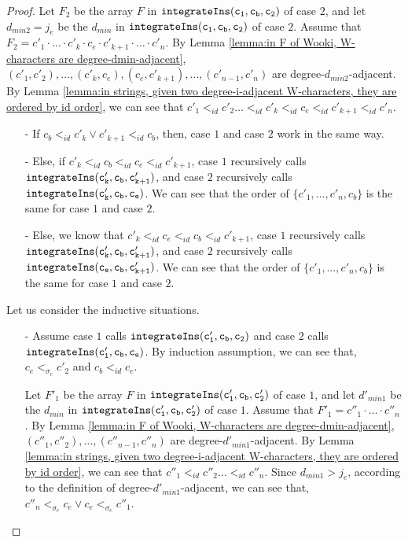 \begin {proof}
Let $F_2$ be the array $F$ in $\alabelshort[{\tt integrateIns}]{c_1,c_b,c_2}$ of case $2$, and let $d_{min2}=j_e$ be the $d_{min}$ in $\alabelshort[{\tt integrateIns}]{c_1,c_b,c_2}$ of case $2$. Assume that $F_2 = c'_1 \cdot \ldots \cdot c'_k \cdot c_e \cdot c'_{k+1} \cdot \ldots \cdot c'_n$. By Lemma \ref{lemma:in F of Wooki, W-characters are degree-dmin-adjacent}, $(c'_1,c'_2),\ldots,(c'_k,c_e),(c_e,c'_{k+1}),\ldots,(c'_{n-1},c'_n)$ are degree-$d_{min2}$-adjacent. By Lemma \ref{lemma:in strings, given two degree-i-adjacent W-characters, they are ordered by id order}, we can see that $c'_1 <_{id} c'_2 \ldots <_{id} c'_k <_{id} c_e <_{id} c'_{k+1} <_{id} c'_n$.

\begin{itemize}
\setlength{\itemsep}{0.5pt}
\item[-] If $c_b <_{id} c'_k \vee c'_{k+1} <_{id} c_b$, then, case $1$ and case $2$ work in the same way.

\item[-] Else, if $c'_k <_{id} c_b <_{id} c_e <_{id} c'_{k+1}$, case $1$ recursively calls $\alabelshort[{\tt integrateIns}]{c'_k,c_b,c'_{k+1}}$, and case $2$ recursively calls $\alabelshort[{\tt integrateIns}]{c'_k,c_b,c_e}$. We can see that the order of $\{ c'_1,\ldots,c'_n,c_b \}$ is the same for case $1$ and case $2$.

\item[-] Else, we know that $c'_k <_{id} c_e <_{id} c_b <_{id} c'_{k+1}$, case $1$ recursively calls $\alabelshort[{\tt integrateIns}]{c'_k,c_b,c'_{k+1}}$, and case $2$ recursively calls $\alabelshort[{\tt integrateIns}]{c_e,c_b,c'_{k+1}}$. We can see that the order of $\{ c'_1,\ldots,c'_n,c_b \}$ is the same for case $1$ and case $2$.
\end{itemize}

 Let us consider the inductive situations.

\begin{itemize}
\setlength{\itemsep}{0.5pt}
\item[-] Assume case $1$ calls $\alabelshort[{\tt integrateIns}]{c'_1,c_b,c_2}$ and case $2$ calls $\alabelshort[{\tt integrateIns}]{c'_1,c_b,c_e}$. By induction assumption, we can see that, $c_e <_{\sigma_e} c'_2$ and $c_b <_{id} c_e$.

    Let $F'_1$ be the array $F$ in $\alabelshort[{\tt integrateIns}]{c'_1,c_b,c'_2}$ of case $1$, and let $d'_{min1}$ be the $d_{min}$ in $\alabelshort[{\tt integrateIns}]{c'_1,c_b,c'_2}$ of case $1$. Assume that $F'_1 = c''_1 \cdot \ldots \cdot c''_n$. By Lemma \ref{lemma:in F of Wooki, W-characters are degree-dmin-adjacent}, $(c''_1,c''_2),\ldots,(c''_{n-1},c''_n)$ are degree-$d'_{min1}$-adjacent. By Lemma \ref{lemma:in strings, given two degree-i-adjacent W-characters, they are ordered by id order}, we can see that $c''_1 <_{id} c''_2 \ldots <_{id} c''_n$. Since $d_{min1} > j_e$, according to the definition of degree-$d'_{min1}$-adjacent, we can see that, $c''_n <_{\sigma_e} c_e \vee c_e <_{\sigma_e} c''_1$.


\end{itemize}
\end{proof}
